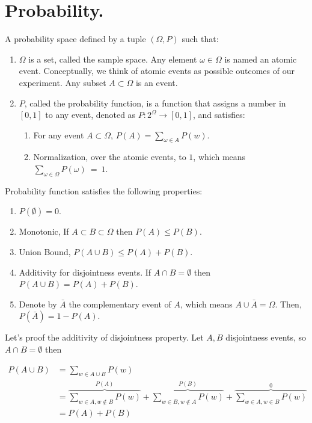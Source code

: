 


\ifdefined\BOOK
\else
\setcounter{chapter}{6}
\fi
\chapter{Probability.} 

\begin{definition}
  A probability space defined by a tuple $(\Omega,P)$ such that:
  \begin{enumerate} 
    \item $\Omega$ is a set, called the sample space. Any element $\omega\in \Omega$ is named an atomic event. Conceptually, we think of atomic events as possible outcomes of our experiment. Any subset $A \subset \Omega$ is an event. 
    \item $P$, called the probability function, is a function that assigns a number in $[0,1]$ to any event, denoted as $P : 2^\Omega \rightarrow [0,1]$, and satisfies:
      \begin{enumerate}
        \item For any event $A \subset \Omega$, $P(A) = \sum_{\omega\in A}P(w)$. 
        \item Normalization, over the atomic events, to $1$, which means $\sum_{\omega\in\Omega}P(\omega)~=~1$.
      \end{enumerate}
  \end{enumerate}
\end{definition}

\begin{claim}
Probability function  satisfies the following properties:
\begin{enumerate}
  \item $P(\emptyset) = 0$.
  \item Monotonic, If $A \subset B \subset \Omega$ then $P(A) \le P(B)$.
  \item Union Bound, $P(A \cup B) \le P(A) + P(B)$.
  \item Additivity for disjointness events. If $A\cap B = \emptyset$ then $P(A \cup B) = P(A) + P(B)$.
  \item Denote by $\bar{A}$ the complementary event of $A$, which means $A\cup\bar{A} = \Omega$. Then, $P(\bar{A}) = 1 - P(A)$.
\end{enumerate}
\end{claim}

\begin{example}
  Let's proof the additivity of disjointness property. Let $A,B$ disjointness events, so $A \cap B = \emptyset$ then 
  
  \begin{equation*}
    \begin{split}
      P(A\cup B) &= \sum_{w \in A \cup B}P(w) \\ 
      &= \overbrace{\sum_{w \in A, w \notin{B}}P(w)}^{P(A)} + \overbrace{\sum_{w \in B, w \notin A}P(w)}^{P(B)}  +\overbrace{ \sum_{w \in A, w \in  B}P(w) }^{ 0 } \\ 
      &= P(A) + P(B) 
    \end{split}
  \end{equation*}
\end{example}

